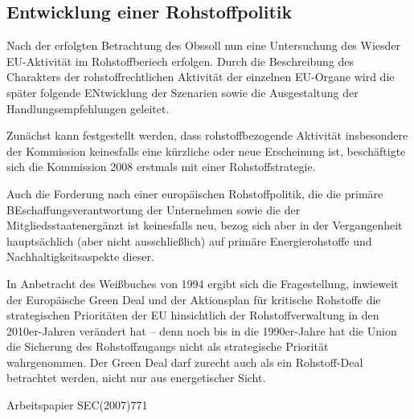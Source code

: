\documentclass[12pt,a4paper,oneside]{book} %
\begin{document}
		
\subsection{Entwicklung einer Rohstoffpolitik}

Nach der erfolgten Betrachtung des \glqq Obs\grqq soll nun eine Untersuchung des \glqq Wies\grqq der EU-Aktivität im Rohstoffberiech erfolgen. Durch die Beschreibung des Charakters der rohstoffrechtlichen Aktivität der einzelnen EU-Organe wird die später folgende ENtwicklung der Szenarien sowie die Ausgestaltung der Handlungsempfehlungen geleitet.

Zunächst kann festgestellt werden, dass rohstoffbezogende Aktivität insbesondere der Kommission keinesfalls eine kürzliche oder neue Erscheinung ist, beschäftigte sich die Kommission 2008 erstmals mit einer Rohstoffstrategie.

Auch die Forderung nach einer europäischen Rohstoffpolitik, die die \glqq primäre BEschaffungsverantwortung der Unternehmen sowie die der Mitgliedsstaaten\grqq ergänzt ist keinesfalls neu, bezog sich aber in der Vergangenheit hauptsächlich (aber nicht ausschließlich) auf primäre Energierohstoffe und Nachhaltigkeitsaspekte dieser.\autocite{Schorkopf, Europäische Rohstoffverwaltung, Rn. 3}

In Anbetracht des Weißbuches von 1994 ergibt sich die Fragestellung, inwieweit der Europäische Green Deal und der Aktionsplan für kritische Rohstoffe die strategischen Prioritäten der EU hinsichtlich der Rohstoffverwaltung in den 2010er-Jahren verändert hat -- denn noch bis in die 1990er-Jahre hat die Union die Sicherung des Rohstoffzugangs nicht als strategische Priorität wahrgenommen\autocite[7]{Kueblboeck_2023}. Der Green Deal darf zurecht auch als ein Rohstoff-Deal betrachtet werden, nicht nur aus energetischer Sicht.\autocite{ZRP 2023, 207}
	
Arbeitspapier SEC(2007)771
	
\end{document}

